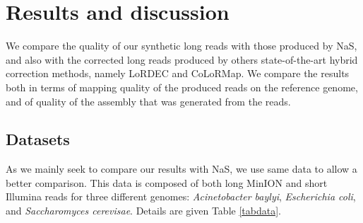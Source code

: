\documentclass{bioinfo}
\begin{document}
\section{Results and discussion}
\label{sec:results}

We compare the quality of our synthetic long reads with those produced by NaS, and also with the corrected long reads produced by others state-of-the-art
hybrid correction methods, namely LoRDEC and CoLoRMap. We compare the results both in terms of mapping quality of the produced reads on the reference genome, and of quality of the assembly that was generated from the reads.

\subsection{Datasets}

As we mainly seek to compare our results with NaS, we use same data to allow a better comparison. This data is composed of both long MinION and short Illumina reads for three different genomes: \emph{Acinetobacter baylyi}, \emph{Escherichia coli}, and \emph{Saccharomyces cerevisae}. Details are given Table \ref{tabdata}.

\begin{table*}[t]
	 \\
	\caption{Description of the datasets used in our experiments. \label{tabdata} Both MinION and Illumina data are available from the Genoscope website: 
	http://www.genoscope.cns.fr/externe/nas/datasets.html TODO : MinION coverage \`a revoir}
\end{table*}
\end{document}
